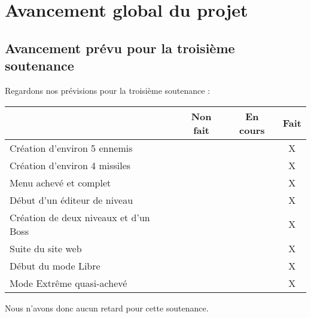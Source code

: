 \documentclass[12pt,a4paper]{article}
\begin{document}
\newpage
\section{Avancement global du projet}
	\subsection{Avancement prévu pour la troisième soutenance}
	Regardons nos prévisions pour la troisième soutenance :
	\begin{center}
		\begin{tabular}{|p{9cm}|c|c|c|}
		\hline
			& Non fait & En cours & Fait \\ \hline
			Création d'environ 5 ennemis & & & X \\ \hline
			Création d'environ 4 missiles & & & X\\ \hline
			Menu achevé et complet & & & X\\ \hline
			Début d'un éditeur de niveau & & & X\\ \hline
			Création de deux niveaux et d'un Boss & & & X\\ \hline
			Suite du site web & & & X\\ \hline
			Début du mode Libre & & & X\\ \hline
			Mode Extrême quasi-achevé & & &X\\ \hline
		\end{tabular}
	\end{center}
	Nous n'avons donc aucun retard pour cette soutenance.
	\newpage
\end{document}
